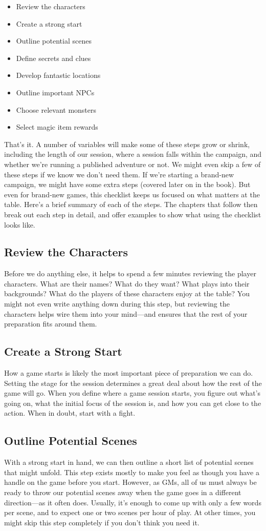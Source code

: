 \documentclass[10pt,a4paper,twoside,bg=print,twocolumn,openany,nodeprecatedcode]{dndbook}
\begin{document}
\begin{itemize}
\item Review the characters
\item Create a strong start
\item Outline potential scenes
\item Define secrets and clues
\item Develop fantastic locations
\item Outline important NPCs
\item Choose relevant monsters
\item Select magic item rewards
\end{itemize}

That's it. A number of variables will make some of these steps grow or shrink, including the length of our session, where a session falls within the campaign, and whether we're running a published adventure or not. We might even skip a few of these steps if we know we don't need them. If we're starting a brand-new campaign, we might have some extra steps (covered later on in the book). But even for brand-new games, this checklist keeps us focused on what matters at the table.
Here's a brief summary of each of the steps. The chapters that follow then break out each step in detail, and offer examples to show what using the checklist looks like.
\subsection{Review the Characters}
Before we do anything else, it helps to spend a few minutes reviewing the player characters. What are their names? What do they want? What plays into their backgrounds? What do the players of these characters enjoy at the table?
You might not even write anything down during this step, but reviewing the characters helps wire them into your mind—and ensures that the rest of your preparation fits around them.
\subsection{Create a Strong Start}
How a game starts is likely the most important piece of preparation we can do. Setting the stage for the session determines a great deal about how the rest of the game will go. When you define where a game session starts, you figure out what's going on, what the initial focus of the session is, and how you can get close to the action. When in doubt, start with a fight.
\subsection{Outline Potential Scenes}
With a strong start in hand, we can then outline a short list of potential scenes that might unfold. This step exists mostly to make you feel as though you have a handle on the game before you start. However, as GMs, all of us must always be ready to throw our potential scenes away when the game goes in a different direction—as it often does. Usually, it's enough to come up with only a few words per scene, and to expect one or two scenes per hour of play. At other times, you might skip this step completely if you don't think you need it.
\end{document}
